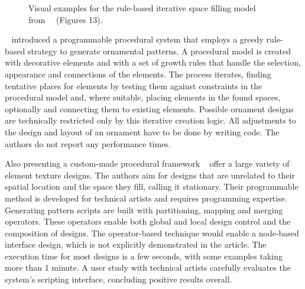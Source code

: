 \begin{figure}[H]
    \centering
    \caption{\label{fig:wong_1998_cgf}Visual examples for the rule-based iterative space filling model from~\citeauthor*{wong_1998_cgf}~\cite{wong_1998_cgf} (Figures 13).}
\end{figure}


\citeauthor*{wong_1998_cgf}~\cite{wong_1998_cgf} introduced a programmable procedural system that employs a greedy rule-based strategy to generate ornamental patterns. A procedural model is created with decorative elements and with a set of growth rules that handle the selection, appearance and connections of the elements. The process iterates, finding tentative places for elements by testing them against constraints in the procedural model and, where suitable, placing elements in the found spaces, optionally and connecting them to existing elements. Possible ornament designs are technically restricted only by this iterative creation logic. All adjustments to the design and layout of an ornament have to be done by writing code. The authors do not report any performance times.

 Also presenting a custom-made procedural framework \citeauthor*{loi_2017_pae}~\cite{loi_2017_pae} offer a large variety of element texture designs. The authors aim for designs that are unrelated to their spatial location and the space they fill, calling it stationary. Their programmable method is developed for technical artists and requires programming expertise. Generating pattern scripts are built with partitioning, mapping and merging operators. These operators enable both global and local design control and the composition of designs. The operator-based technique would enable a node-based interface design, which is not explicitly demonstrated in the article. The execution time for most designs is a few seconds, with some examples taking more than 1 minute. A user study with technical artists carefully evaluates the system's scripting interface, concluding positive results overall.

